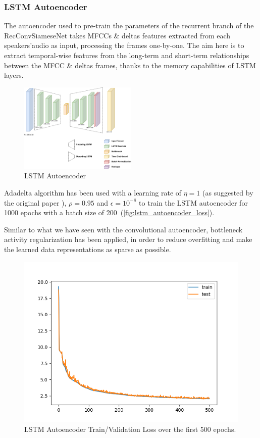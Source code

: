 \subsubsection{LSTM Autoencoder}\label{subsec:recautoencoder}
The autoencoder used to pre-train the parameters of the recurrent branch of the RecConvSiameseNet takes MFCCs \& deltas features extracted from each speakers'audio as input, processing the frames one-by-one. The aim here is to extract temporal-wise features from the long-term and short-term relationships between the MFCC \& deltas frames, thanks to the memory capabilities of LSTM layers.

\begin{figure}
	\includegraphics[width=0.5\textwidth]{images/lstm_autoencoder}
	\caption{LSTM Autoencoder}
	\label{fig:lstm_autoencoder}
\end{figure}

Adadelta algorithm has been used with a learning rate of $\eta = 1$ (as suggested by the original paper \cite{adadelta}), $\rho=0.95$ and $\epsilon=10^{-8}$ to train the LSTM autoencoder for 1000 epochs with a batch size of 200~(\vref{fig:lstm_autoencoder_loss}). 

Similar to what we have seen with the convolutional autoencoder, bottleneck activity regularization has been applied, in order to reduce overfitting and make the learned data representations as sparse as possible.

\begin{figure}
	\includegraphics[scale=0.5]{images/lstm_autoencoder_graph.png}
	\caption{LSTM Autoencoder Train/Validation Loss over the first 500 epochs.}
	\label{fig:lstm_autoencoder_loss}
\end{figure}

